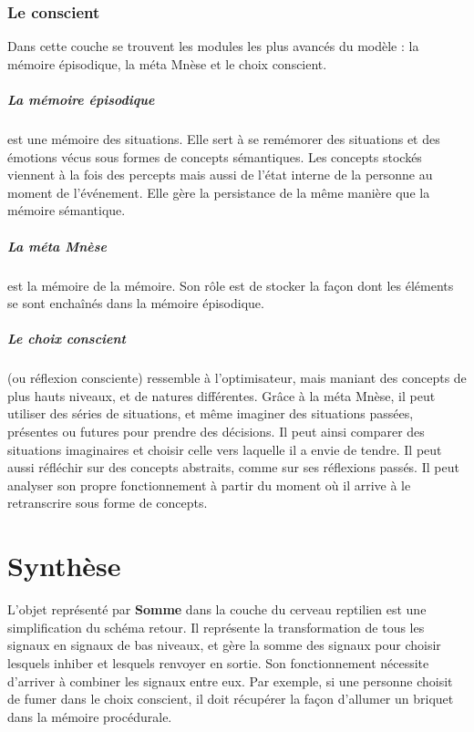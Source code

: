\subsubsection{Le conscient} Dans cette couche se trouvent les modules les plus
avancés du modèle : la mémoire épisodique, la méta Mnèse  et le choix conscient.
\subparagraph{La mémoire épisodique} est une mémoire des situations. Elle sert à
se remémorer des situations et des émotions vécus sous formes de concepts sémantiques. Les
concepts stockés viennent à la fois des percepts mais aussi de l’état interne de
la personne au moment de l’événement. Elle gère la persistance de la même
manière que la mémoire sémantique.
\subparagraph{La méta Mnèse} est la mémoire de la mémoire. Son rôle est de stocker la
façon dont les éléments se sont enchaînés dans la mémoire épisodique.
\subparagraph{Le choix conscient} (ou réflexion consciente) ressemble à l'optimisateur,
mais maniant des concepts de plus hauts niveaux, et de natures différentes. Grâce à
la méta Mnèse, il peut utiliser des séries de situations, et même imaginer des
situations passées, présentes ou futures pour prendre des décisions. Il peut
ainsi comparer des situations imaginaires et choisir celle vers laquelle il a
envie de tendre. Il peut aussi réfléchir sur des concepts abstraits, comme sur
ses réflexions passés. Il peut analyser son propre fonctionnement à partir du
moment où il arrive à le retranscrire sous forme de concepts.

\section{Synthèse}
L’objet représenté par \textbf{Somme} dans la couche du cerveau reptilien
est une simplification du schéma retour. Il représente la transformation de tous les
signaux en signaux de bas niveaux, et gère la somme des signaux pour choisir
lesquels inhiber et lesquels renvoyer en sortie. Son fonctionnement nécessite
d’arriver à combiner les signaux entre eux. Par exemple, si une personne choisit
de fumer dans le choix conscient, il doit récupérer la façon d’allumer un
briquet dans la mémoire procédurale.
